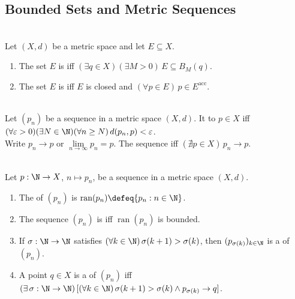 \subsection{Bounded Sets and Metric Sequences}

\begin{definition} \label{def:bounded-and-perfect-metric-sets} \\
Let $(X,d)$ be a metric space and let $E\subseteq X$.
\begin{enumerate}[label=(\roman*)]
\setlength{\itemsep}{0pt}
\item The set $E$ is  iff $(\exists q\in X)(\exists M>0)\,E\subseteq B_M(q)$.
\item The set $E$ is  iff $E$ is closed and $(\forall p\in E)\,p\in E^{\operatorname{acc}}$.
\end{enumerate}
\end{definition}

\begin{definition} \label{def:sequence-convergence-metric} \\
Let $(p_n)$ be a sequence in a metric space $(X,d)$. It  to $p\in X$ iff $(\forall\varepsilon>0)(\exists N\in\N)(\forall n\geq N)\,d(p_n,p)<\varepsilon$.\\
Write $p_n\to p$ or $\lim\limits_{n\to\infty}p_n=p$. The sequence  iff $(\nexists p\in X)\,p_n\to p$.
\end{definition}

\begin{definition} \label{def:sequence-range-and-boundedness} \\
Let $p:\N\to X$, $n\mapsto p_n$, be a sequence in a metric space $(X,d)$.
\begin{enumerate}[label=(\roman*)]
\setlength{\itemsep}{0pt}
\item The  of $(p_n)$ is $\operatorname{ran}(p_n)\defeq\{p_n:n\in\N\}$.
\item The sequence $(p_n)$ is  iff $\operatorname{ran}(p_n)$ is bounded.
\item If $\sigma:\N\to\N$ satisfies $(\forall k\in\N)\,\sigma(k+1)>\sigma(k)$, then $(p_{\sigma(k)})_{k\in\N}$ is a  of $(p_n)$.
\item A point $q\in X$ is a  of $(p_n)$ iff $(\exists\,\sigma:\N\to\N)\,[(\forall k\in\N)\,\sigma(k+1)>\sigma(k)\land p_{\sigma(k)}\to q]$.
\end{enumerate}
\end{definition}

